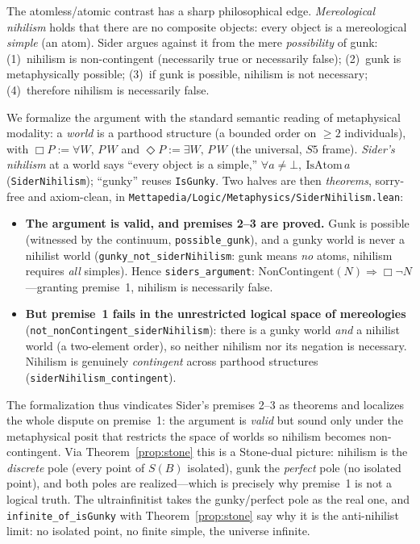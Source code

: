 \documentclass[]{article}
\theoremstyle{definition}
\theoremstyle{remark}
\newcommand{\code}[1]{\texttt{#1}}
\newcommand{\lpath}[1]{{\ttfamily\nolinkurl{#1}}}
\begin{document}
The atomless/atomic contrast has a sharp philosophical edge. \emph{Mereological
nihilism} holds that there are no composite objects: every object is a mereological
\emph{simple} (an atom). Sider \cite{Sider1993} argues against it from the mere
\emph{possibility} of gunk: (1)~nihilism is non-contingent (necessarily true or
necessarily false); (2)~gunk is metaphysically possible; (3)~if gunk is possible,
nihilism is not necessary; (4)~therefore nihilism is necessarily false.

We formalize the argument with the standard semantic reading of metaphysical modality:
a \emph{world} is a parthood structure (a bounded order on $\geq 2$ individuals), with
$\Box P := \forall W,\,P\,W$ and $\Diamond P := \exists W,\,P\,W$ (the universal, $S5$
frame). \emph{Sider's nihilism} at a world says ``every object is a simple,''
$\forall a\neq\bot,\ \mathrm{IsAtom}\,a$ (\code{SiderNihilism}); ``gunky'' reuses
\code{IsGunky}. Two halves are then \emph{theorems}, sorry-free and axiom-clean, in
\lpath{Mettapedia/Logic/Metaphysics/SiderNihilism.lean}:
\begin{itemize}
\item \textbf{The argument is valid, and premises 2--3 are proved.} Gunk is possible
  (witnessed by the continuum, \code{possible\_gunk}), and a gunky world is never a
  nihilist world (\code{gunky\_not\_siderNihilism}: gunk means \emph{no} atoms, nihilism
  requires \emph{all} simples). Hence \code{siders\_argument}:
  $\mathrm{NonContingent}(N)\Rightarrow\Box\neg N$---granting premise~1, nihilism is
  necessarily false.
\item \textbf{But premise~1 fails in the unrestricted logical space of mereologies}
  (\code{not\_nonContingent\_siderNihilism}): there is a gunky world \emph{and} a nihilist
  world (a two-element order), so neither nihilism nor its negation is necessary. Nihilism
  is genuinely \emph{contingent} across parthood structures
  (\code{siderNihilism\_contingent}).
\end{itemize}

The formalization thus vindicates Sider's premises 2--3 as theorems and localizes the
whole dispute on premise~1: the argument is \emph{valid} but sound only under the
metaphysical posit that restricts the space of worlds so nihilism becomes non-contingent.
Via Theorem~\ref{prop:stone} this is a Stone-dual picture: nihilism is the
\emph{discrete} pole (every point of $S(B)$ isolated), gunk the \emph{perfect} pole
(no isolated point), and both poles are realized---which is precisely why premise~1 is not
a logical truth. The ultrainfinitist takes the gunky/perfect pole as the real one, and
\code{infinite\_of\_isGunky} with Theorem~\ref{prop:stone} say why it is the anti-nihilist
limit: no isolated point, no finite simple, the universe infinite.
\end{document}

